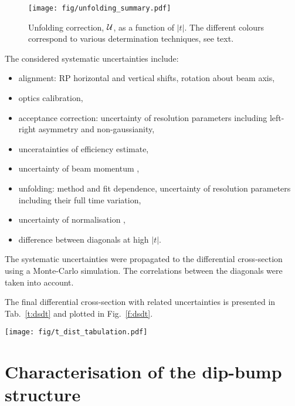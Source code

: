 \documentclass[doublecol]{epl/epl2}
\begin{document}
\begin{figure}
\begin{center}
\texttt{[image: fig/unfolding\_summary.pdf]}
\vskip-5mm
\caption{Unfolding correction, ${\cal U}$, as a function of $|t|$. The different colours correspond to various determination techniques, see text.}
\label{f:unfolding}
\end{center}
\end{figure}

The considered systematic uncertainties include:
\begin{itemize}[topsep=0pt,itemsep=-2pt]
\item alignment: RP horizontal and vertical shifts, rotation about beam axis,
\item optics calibration,
\item acceptance correction: uncertainty of resolution parameters including left-right asymmetry and non-gaussianity,
\item unceratainties of efficiency estimate,
\item uncertainty of beam momentum \cite{beam-mom-unc},
\item unfolding: method and fit dependence, uncertainty of resolution parameters including their full time variation,
\item uncertainty of normalisation \cite{totem-8tev-tot1},
\item difference between diagonals at high $|t|$.
\end{itemize}
The systematic uncertainties were propagated to the differential cross-section using a Monte-Carlo simulation. The correlations between the diagonals were taken into account. %



The final differential cross-section with related uncertainties is presented in Tab.~\ref{t:dsdt} and plotted in Fig.~\ref{f:dsdt}.

\begin{figure*}
\begin{center}
\texttt{[image: fig/t\_dist\_tabulation.pdf]}
\vskip-5mm
\caption{Differential cross-section from Tab.~\ref{t:dsdt}.}
\label{f:dsdt}
\end{center}
\end{figure*}


\section{Characterisation of the dip-bump structure}
\label{s:dip-bump}
\end{document}
